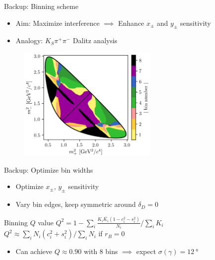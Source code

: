 \documentclass{beamer}
\begin{document}
\begin{frame}{Backup: Binning scheme}
  \begin{itemize}
    \setlength\itemsep{1.3em}
    \item{Aim: Maximize interference $\implies$ Enhance $x_\pm$ and $y_\pm$ sensitivity}
    \item{Analogy: $K_S\pi^+\pi^-$ Dalitz analysis}
  \end{itemize}
  \begin{figure}
    \centering
    \includegraphics[width = 0.6\textwidth]{DalitzKSpipi.png}
  \end{figure}
\end{frame}

\begin{frame}{Backup: Optimize bin widths}
  \begin{itemize}
    \item{Optimize $x_\pm$, $y_\pm$ sensitivity}
    \item{Vary bin edges, keep symmetric around $\delta_D = 0$}
  \end{itemize}
  \begin{block}{Binning $Q$ value}
    $Q^2 = 1 - \sum_i\frac{K_i\bar{K_i}(1 - c_i^2 - s_i^2)}{N_i}\Big/\sum_iK_i$ \\
    $Q^2\approx\sum_iN_i(c_i^2 + s_i^2)\Big/\sum_iN_i$ if $r_B = 0$
  \end{block}
  \begin{itemize}
    \item{Can achieve $Q\approx0.90$ with $8$ bins $\implies$ expect $\sigma(\gamma) = \SI{12}{\degree}$}
  \end{itemize}
\end{frame}
\end{document}
